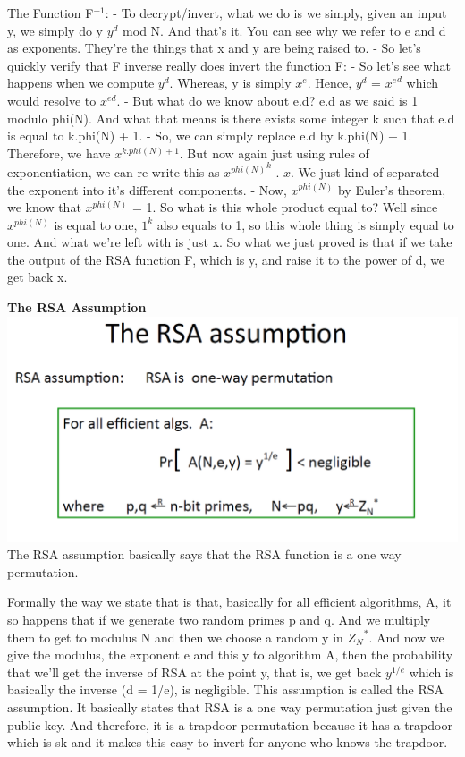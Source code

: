 \documentclass[11pt]{article}
\makeatletter
\def\maxwidth{\ifdim\Gin@nat@width>\linewidth\linewidth
    \else\Gin@nat@width\fi}
\let\Oldincludegraphics\includegraphics
\renewcommand{\includegraphics}[1]{\Oldincludegraphics[width=.8\maxwidth]{#1}}
\makeatother
\begin{document}
The Function F\(^{-1}\): - To decrypt/invert, what we do is we simply,
given an input y, we simply do y \(y^{d}\) mod N. And that's it. You can
see why we refer to e and d as exponents. They're the things that x and
y are being raised to. - So let's quickly verify that F inverse really
does invert the function F: - So let's see what happens when we compute
\(y^{d}\). Whereas, y is simply \(x^{e}\). Hence, \(y^{d}\) =
\({x^{e}}^{d}\) which would resolve to \(x^{ed}\). - But what do we know
about e.d? e.d as we said is 1 modulo phi(N). And what that means is
there exists some integer k such that e.d is equal to k.phi(N) + 1. -
So, we can simply replace e.d by k.phi(N) + 1. Therefore, we have
\(x^{k.phi(N) + 1}\). But now again just using rules of exponentiation,
we can re-write this as \({x^{phi(N)}}^k\) . \(x\). We just kind of
separated the exponent into it's different components. - Now,
\(x^{phi(N)}\) by Euler's theorem, we know that \(x^{phi(N)}\) = 1. So
what is this whole product equal to? Well since \(x^{phi(N)}\) is equal
to one, \(1^{k}\) also equals to 1, so this whole thing is simply equal
to one. And what we're left with is just x. So what we just proved is
that if we take the output of the RSA function F, which is y, and raise
it to the power of d, we get back x.

\textbf{The RSA Assumption}
\includegraphics{./Images/RSA-Assumption.png} The RSA assumption
basically says that the RSA function is a one way permutation.

Formally the way we state that is that, basically for all efficient
algorithms, A, it so happens that if we generate two random primes p and
q. And we multiply them to get to modulus N and then we choose a random
y in \({Z_{N}}^{*}\). And now we give the modulus, the exponent e and
this y to algorithm A, then the probability that we'll get the inverse
of RSA at the point y, that is, we get back \(y^{1/e}\) which is
basically the inverse (d = 1/e), is negligible. This assumption is
called the RSA assumption. It basically states that RSA is a one way
permutation just given the public key. And therefore, it is a trapdoor
permutation because it has a trapdoor which is sk and it makes this easy
to invert for anyone who knows the trapdoor.
\end{document}
